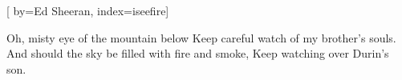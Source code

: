

[%
    by={Ed Sheeran},
    index={iseefire}]


    \label{iseefire}



    \beginverse*
        Oh, misty eye of the mountain below
        Keep careful watch of my brother's souls.
        And should the sky be filled with fire and smoke,
        Keep watching over Durin's son.
    \endverse

